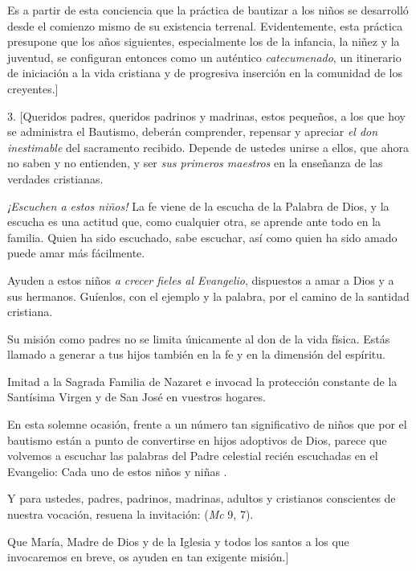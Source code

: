 \begin{body}
					Es a partir de esta conciencia que la práctica de bautizar a los niños se desarrolló desde el comienzo mismo de su existencia terrenal. Evidentemente, esta práctica presupone que los años siguientes, especialmente los de la infancia, la niñez y la juventud, se configuran entonces como un auténtico \emph{catecumenado}, un itinerario de iniciación a la vida cristiana y de progresiva inserción en la comunidad de los creyentes.{]}
					
					3. {[}Queridos padres, queridos padrinos y madrinas, estos pequeños, a los que hoy se administra el Bautismo, deberán comprender, repensar y apreciar \emph{el don inestimable} del sacramento recibido. Depende de ustedes unirse a ellos, que ahora no saben y no entienden, y ser \emph{sus primeros maestros} en la enseñanza de las verdades cristianas.
					
					\emph{¡Escuchen a estos niños!} La fe viene de la escucha de la Palabra de Dios, y la escucha es una actitud que, como cualquier otra, se aprende ante todo en la familia. Quien ha sido escuchado, sabe escuchar, así como quien ha sido amado puede amar más fácilmente.
					
					Ayuden a estos niños \emph{a crecer fieles al Evangelio}, dispuestos a amar a Dios y a sus hermanos. Guíenlos, con el ejemplo y la palabra, por el camino de la santidad cristiana.
					
					Su misión como padres no se limita únicamente al don de la vida física. Estás llamado a generar a tus hijos también en la fe y en la dimensión del espíritu.
					
					Imitad a la Sagrada Familia de Nazaret e invocad la protección constante de la Santísima Virgen y de San José en vuestros hogares.
					
					En esta solemne ocasión, frente a un número tan significativo de niños que por el bautismo están a punto de convertirse en hijos adoptivos de Dios, parece que volvemos a escuchar las palabras del Padre celestial recién escuchadas en el Evangelio: Cada uno de estos niños y niñas .
					
					Y para ustedes, padres, padrinos, madrinas, adultos y cristianos conscientes de nuestra vocación, resuena la invitación:  (\emph{Mc} 9, 7).
					
					Que María, Madre de Dios y de la Iglesia y todos los santos a los que invocaremos en breve, os ayuden en tan exigente misión.{]}
				\end{body}
			
